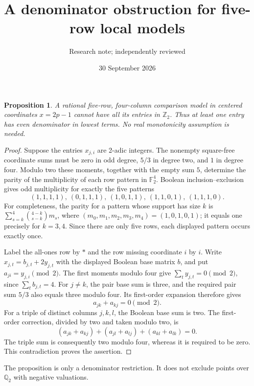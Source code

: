 \documentclass[11pt]{article}
\title{A denominator obstruction for five-row local models}
\author{Research note; independently reviewed}
\date{30 September 2026}
\newtheorem{proposition}{Proposition}
\begin{document}
\maketitle
\begin{proposition}
A rational five-row, four-column comparison model in centered
coordinates $x=2p-1$ cannot have all its entries in $\mathbb Z_2$. Thus at least one entry has even denominator
in lowest terms. No real monotonicity assumption is needed.
\end{proposition}
\begin{proof}
Suppose the entries $x_{j,i}$ are 2-adic integers. The nonempty
square-free coordinate sums must be zero in odd degree, $5/3$ in
degree two, and $1$ in degree four. Modulo two these moments, together
with the empty sum $5$, determine the parity of the multiplicity of
each row pattern in $\mathbb F_2^4$. Boolean inclusion--exclusion gives
odd multiplicity for exactly the five patterns
\[
 (1,1,1,1),\ (0,1,1,1),\ (1,0,1,1),\ (1,1,0,1),\ (1,1,1,0).
\]
For completeness, the parity for a pattern whose support has size $k$
is $\sum_{s=k}^4\binom{4-k}{s-k}m_s$, where
$(m_0,m_1,m_2,m_3,m_4)=(1,0,1,0,1)$; it equals one precisely for
$k=3,4$. Since there are only five rows, each displayed pattern occurs
exactly once.

Label the all-ones row by $*$ and the row missing coordinate $i$ by
$i$. Write $x_{j,t}=b_{j,t}+2y_{j,t}$ with the displayed Boolean base
matrix $b$, and put $a_{ji}=y_{j,i}\pmod2$. The first moments modulo
four give $\sum_t y_{j,t}=0\pmod2$, since $\sum_t b_{j,t}=4$.
For $j\ne k$, the pair base sum is three, and the required pair sum
$5/3$ also equals three modulo four. Its first-order expansion
therefore gives
\[
 a_{jk}+a_{kj}=0\pmod2.
\]
For a triple of distinct columns $j,k,l$, the Boolean base sum is two.
The first-order correction, divided by two and taken modulo two, is
\[
 (a_{jk}+a_{kj})+(a_{jl}+a_{lj})+(a_{kl}+a_{lk})=0.
\]
The triple sum is consequently two modulo four, whereas it is
required to be zero. This contradiction proves the assertion.
\end{proof}
The proposition is only a denominator restriction. It does not
exclude points over $\mathbb Q_2$ with negative valuations.
\end{document}
